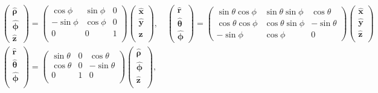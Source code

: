 \documentclass[10pt]{article}
\newcommand{\rhat}{\boldsymbol{\hat{\textbf{r}}}}
\newcommand{\xhat}{\boldsymbol{\hat{\textbf{x}}}}
\newcommand{\yhat}{\boldsymbol{\hat{\textbf{y}}}}
\newcommand{\zhat}{\boldsymbol{\hat{\textbf{z}}}}
\newcommand{\phihat}{\boldsymbol{\hat{\textbf{$\phi$}}}}
\newcommand{\thetahat}{\boldsymbol{\hat{\textbf{$\theta$}}}}
\newcommand{\rhohat}{\boldsymbol{\hat{\textbf{$\rho$}}}}
\begin{document}
\begin{multicols}{2}
\begin{align*}
 		&\begin{pmatrix}
			\rhohat \\
			\phihat \\
			\zhat
 		\end{pmatrix} =
 		\begin{pmatrix}
 			\cos \phi & \sin \phi & 0 \\
 			-\sin \phi & \cos \phi & 0 \\
 			0 & 0 & 1 \\
 		\end{pmatrix} 
 		\begin{pmatrix}
 			\xhat \\
 			\yhat \\
 			\zhat \\
 		\end{pmatrix}, \quad
 		\begin{pmatrix}
			\rhat \\
			\thetahat \\
			\phihat
 		\end{pmatrix} =
 		\begin{pmatrix}
			\sin \theta \cos \phi & \sin \theta \sin \phi & \cos \theta\\
			\cos \theta \cos \phi & \cos \theta \sin \phi & - \sin \theta \\
			-\sin \phi & \cos \phi & 0
 		\end{pmatrix} 
 		\begin{pmatrix}
 			\xhat \\
 			\yhat \\
 			\zhat \\
 		\end{pmatrix} \\
 		& \begin{pmatrix}
 			\rhat \\
 			\thetahat \\
 			\phihat \\
 		\end{pmatrix} = 
 		\begin{pmatrix}
 			\sin \theta & 0 & \cos \theta \\
 			\cos \theta & 0 & -\sin \theta \\
 			0 & 1 & 0 \\
 		\end{pmatrix}
 		\begin{pmatrix}
 			\rhohat \\
 			\phihat \\
 			\zhat \\
 		\end{pmatrix}, \quad 

\end{align*}
\end{multicols}
\end{document}
